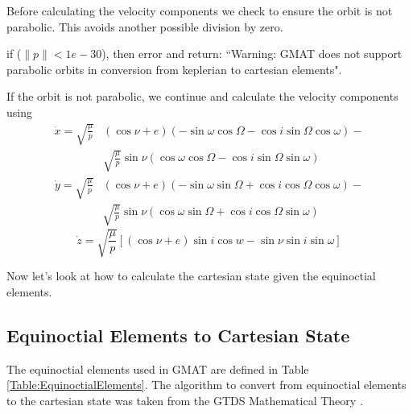 Before calculating the velocity components we check to ensure the
orbit is not parabolic.  This avoids another possible division by
zero.

\noindent if ($\| p\| < 1e-30$), then error and return: ``Warning:
GMAT does not support parabolic orbits in conversion from
keplerian to cartesian elements".

\noindent If the orbit is not parabolic, we continue and calculate
the velocity components using
%
\begin{equation}\begin{split}
     \dot{x} = \sqrt{\frac{\mu}{p}} &  \left( \cos{\nu} + e \right)
     \left( -\sin{\omega}\cos{\Omega} - \cos{i}\sin{\Omega}\cos{\omega}
     \right)- \\ &\sqrt{\frac{\mu}{p}}  \sin{\nu}\left(\cos{\omega}\cos{\Omega} - \cos{i}\sin{\Omega}\sin{\omega} \right)
      \end{split}
\end{equation}
%
\begin{equation}\begin{split}
     \dot{y} =    \sqrt{\frac{\mu}{p}}&  \left( \cos{\nu} + e \right)
     \left( -\sin{\omega}\sin{\Omega} + \cos{i}\cos{\Omega}\cos{\omega}
     \right)- \\\ & \sqrt{\frac{\mu}{p}}\sin{\nu}\left(\cos{\omega}\sin{\Omega} + \cos{i}\cos{\Omega}\sin{\omega} \right)
     \end{split}
\end{equation}
%
\begin{equation}
     \dot{z} = \sqrt{\frac{\mu}{p}} \left[ \left( \cos{\nu} + e \right)\sin{i}\cos{w} - \sin{\nu}\sin{i}\sin{\omega}      \right]
\end{equation}

Now let's look at how to calculate the cartesian state given the
equinoctial elements.

\subsection{Equinoctial Elements to Cartesian State}  
\label{Sec:EquinoctialtoCartesian}

The equinoctial elements used in GMAT are defined in Table
\ref{Table:EquinoctialElements}.  The algorithm to convert from
equinoctial elements to the cartesian state was taken from the
GTDS Mathematical Theory \cite{GTDS}.

